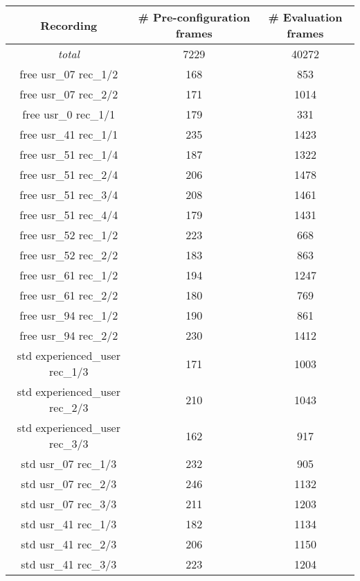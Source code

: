 \begin{tabular}{|c|c|c|}
    \hline
    \textbf{Recording} & \textbf{\# Pre-configuration frames} & \textbf{\# Evaluation frames} \\
    \hline
    \textit{total} & 7229 & 40272 \\
    \hline
    free usr\_07 rec\_1/2 & 168 & 853 \\
    \hline
    free usr\_07 rec\_2/2 & 171 & 1014 \\
    \hline
    free usr\_0 rec\_1/1 & 179 & 331 \\
    \hline
    free usr\_41 rec\_1/1 & 235 & 1423 \\
    \hline
    free usr\_51 rec\_1/4 & 187 & 1322 \\
    \hline
    free usr\_51 rec\_2/4 & 206 & 1478 \\
    \hline
    free usr\_51 rec\_3/4 & 208 & 1461 \\
    \hline
    free usr\_51 rec\_4/4 & 179 & 1431 \\
    \hline
    free usr\_52 rec\_1/2 & 223 & 668 \\
    \hline
    free usr\_52 rec\_2/2 & 183 & 863 \\
    \hline
    free usr\_61 rec\_1/2 & 194 & 1247 \\
    \hline
    free usr\_61 rec\_2/2 & 180 & 769 \\
    \hline
    free usr\_94 rec\_1/2 & 190 & 861 \\
    \hline
    free usr\_94 rec\_2/2 & 230 & 1412 \\
    \hline
    std experienced\_user rec\_1/3 & 171 & 1003 \\
    \hline
    std experienced\_user rec\_2/3 & 210 & 1043 \\
    \hline
    std experienced\_user rec\_3/3 & 162 & 917 \\
    \hline
    std usr\_07 rec\_1/3 & 232 & 905 \\
    \hline
    std usr\_07 rec\_2/3 & 246 & 1132 \\
    \hline
    std usr\_07 rec\_3/3 & 211 & 1203 \\
    \hline
    std usr\_41 rec\_1/3 & 182 & 1134 \\
    \hline
    std usr\_41 rec\_2/3 & 206 & 1150 \\
    \hline
    std usr\_41 rec\_3/3 & 223 & 1204 \\

\end{tabular}
